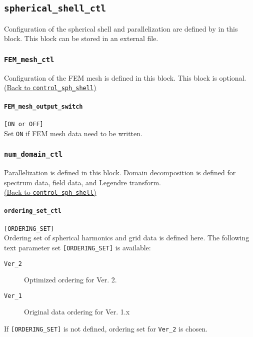 \subsection{\tt spherical\_shell\_ctl}
\label{href_t:spherical_shell_ctl}
Configuration of the spherical shell and parallelization are defined by in this block. This block can be stored in an external file.
%

\subsubsection{\tt FEM\_mesh\_ctl}
\label{href_t:FEM_mesh_ctl}
Configuration of the FEM mesh is defined in this block. This block is optional.
\hyperref[href_i:FEM_mesh_ctl]{(Back to {\tt control\_sph\_shell})}

\paragraph{\tt FEM\_mesh\_output\_switch}
\label{href_t:FEM_mesh_output_switch}
\verb|[ON or OFF]| \\
Set \verb|ON| if FEM mesh data need to be written.
%

\subsubsection{\tt num\_domain\_ctl}
\label{href_t:num_domain_ctl}
Parallelization is defined in this block. Domain decomposition is defined for spectrum data, field data, and Legendre transform. \\
\hyperref[href_i:num_domain_ctl]{(Back to {\tt control\_sph\_shell})}

\paragraph{\tt ordering\_set\_ctl}
\label{href_t:ordering_set_ctl}
\verb|[ORDERING_SET]| \\
 Ordering set of spherical harmonics and grid data is defined here.  The following text parameter set \verb|[ORDERING_SET]| is available:
 \begin{description}
 \item[{\tt Ver\_2}]  Optimized ordering for Ver. 2.
 \item[{\tt Ver\_1}] Original data ordering for Ver. 1.x
 \end{description} 

If \verb|[ORDERING_SET]| is not defined, ordering set for \verb|Ver_2| is chosen.

